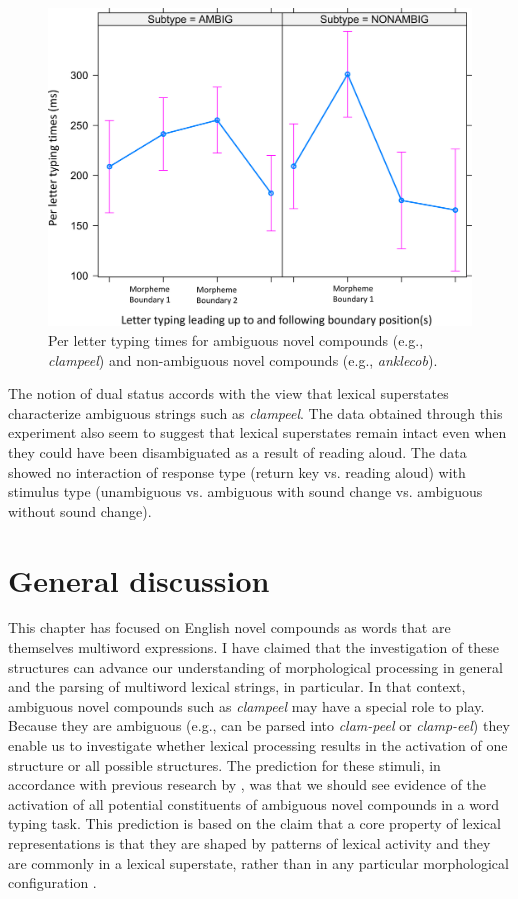 \documentclass[output=paper]{langsci/langscibook}
\begin{document}
  
\begin{figure}
\includegraphics[width=.8\textwidth]{figures/Libbenfigure4.png}
\caption{\label{fig:libben:4}Per letter typing times for ambiguous novel compounds (e.g., \textit{clampeel}) and non-ambiguous novel compounds (e.g., \textit{anklecob}).}
\end{figure}

The notion of dual status accords with the view that lexical superstates characterize ambiguous strings such as \textit{clampeel}.  The data obtained through this experiment also seem to suggest that lexical superstates remain intact even when they could have been disambiguated as a result of reading aloud.  The data showed no interaction of response type (return key vs. reading aloud) with stimulus type (unambiguous vs. ambiguous with sound change vs. ambiguous without sound change).

\section{General discussion}\label{sec:libben:4}

This chapter has focused on English novel compounds as words that are themselves multiword expressions. I have claimed that the investigation of these structures can advance our understanding of morphological processing in general and the parsing of multiword lexical strings, in particular.  In that context, ambiguous novel compounds such as \textit{clampeel} may have a special role to play. Because they are ambiguous (e.g., can be parsed into \textit{clam-peel} or \textit{clamp-eel}) they enable us to investigate whether lexical processing results in the activation of one structure or all possible structures.  The prediction for these stimuli, in accordance with previous research by \citet{LibbenDerwingdeAlmeida1999}, was that we should see evidence of the activation of all potential constituents of ambiguous novel compounds in a word typing task.  This prediction is based on the claim that a core property of lexical representations is that they are shaped by patterns of lexical activity and they are commonly in a lexical superstate, rather than in any particular morphological configuration \citep{Libbeninpress}.  
\end{document}
